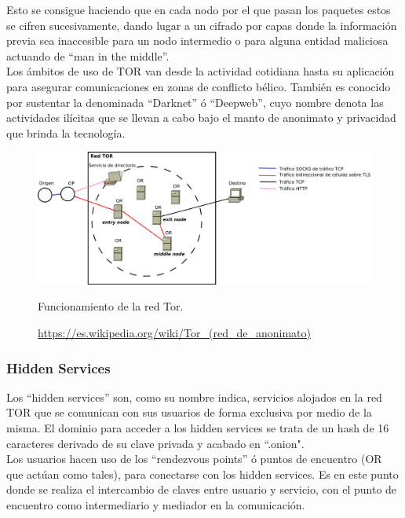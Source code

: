 Esto se consigue haciendo que en cada nodo por el que pasan los paquetes estos se cifren sucesivamente, dando lugar a un cifrado por capas donde la información previa sea inaccesible para un nodo intermedio o para alguna entidad maliciosa actuando de \hyphenquote{spanish}{man in the middle}. \\


Los ámbitos de uso de TOR van desde la actividad cotidiana hasta su aplicación para asegurar comunicaciones en zonas de conflicto bélico. También es conocido por sustentar la denominada \hyphenquote{spanish}{Darknet} ó \hyphenquote{spanish}{Deepweb}, cuyo nombre denota las actividades ilícitas que se llevan a cabo bajo el manto de anonimato y privacidad que brinda la tecnología. \\

\begin{figure}[H]
	\centering
	\includegraphics[width=\textwidth]{imagenes/funcionamiento_tor}
	\caption{Funcionamiento de la red Tor.}
	\caption*{\small \url {https://es.wikipedia.org/wiki/Tor_(red_de_anonimato)}}
	\label{fig:redtor}
\end{figure}

\subsubsection {Hidden Services}

Los \hyphenquote{spanish}{hidden services} son, como su nombre indica, servicios alojados en la red TOR que se comunican con sus usuarios de forma exclusiva por medio de la misma. El dominio para acceder a los hidden services se trata de un hash de 16 caracteres derivado de su clave privada y acabado en ``.onion". \\

Los usuarios hacen uso de los \hyphenquote{spanish}{rendezvous points} ó puntos de encuentro (OR que actúan como tales), para conectarse con los hidden services. Es en este punto donde se realiza el intercambio de claves entre usuario y servicio, con el punto de encuentro como intermediario y mediador en la comunicación. \\ 


